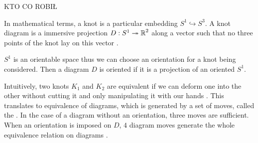 {\large\color{red}KTO CO ROBIŁ}

In mathematical terms, a knot is a particular embedding $S^1\hookrightarrow S^3$. A knot diagram is a {\color{blue}immersive projection} $D:S^1\twoheadrightarrow \operatorname{\mathbb{R}}^2$ along a vector such that no three points of the knot lay on this vector \cite{likorish-diagram}.

$S^1$ is an orientable space thus we can choose an orientation for a knot being considered. Then a diagram $D$ is oriented if it is a projection of an oriented $S^1$.

Intuitively, two knots $K_1$ and $K_2$ are equivalent if we can deform one into the other without cutting it and only manipulating it with our hands \cite{murasagi-equivalence}. This translates to equivalence of diagrams, which is generated by a set of moves, called the . In the case of a diagram without an orientation, three moves are sufficient. When an orientation is imposed on $D$, $4$ diagram moves generate the whole equivalence relation on diagrams \cite{ruchy_zorientowane}.
